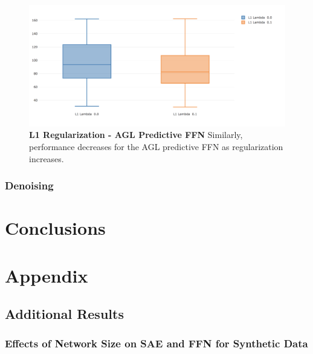 \documentclass[a4paper,11pt,oneside]{article}
\theoremstyle{plain}
\theoremstyle{definition}
\begin{document}
\begin{figure}[H]
	\centering \includegraphics[scale=0.3]{images/iteration_five/it5_reg_ffn.png}
	\caption{\textbf{L1 Regularization - AGL Predictive FFN}
			\newline Similarly, performance decreases for the AGL predictive FFN as regularization increases.}
	\label{figure-results-it5_reg_ffn}
\end{figure}		


\subsubsection{Denoising}













\newpage
\section{Conclusions}\label{Conclusion}


\section{Appendix}\label{Appendix}

\subsection{Additional Results}

\subsubsection{Effects of Network Size on SAE and FFN for Synthetic Data}\label{appendix_sae_ffn_network_size}
\end{document}
